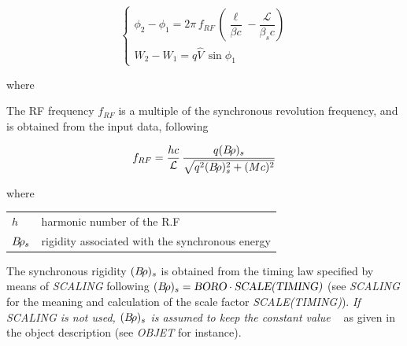 {$$ \left\{ 
\begin{array}{l}
	\phi_ 2-\phi_ 1= 2\pi \, f_{RF}\, 
	     \left(  \dfrac{\ell}{ \beta c} - \dfrac{\mathcal{L} }{ \beta_sc} \right) \\
	W_2-W_1 = q\hat  V\, \sin\phi_ 1  
\end{array}
\right. $$

\noindent  where
  
{\renewcommand{\arraystretch}{1}
 }
\bigskip

\noindent The RF frequency $ f_{RF} $ is a multiple of the synchronous 
revolution frequency, and is obtained from the input data, following 

$$ f_{RF} = \dfrac{hc }{\mathcal{L}}\, \dfrac{q(B\!\rho )_s }{ \sqrt{q^2(B\!\rho)^2_s+(Mc)^2}} $$

\noindent  where
   \begin{tabular}{l!{=}l}
   $h$ & harmonic  number  of  the  R.F\\
  $B\!\rho_s$ &  rigidity  associated with the synchronous energy \\
  \end{tabular}

\bigskip

\noindent The synchronous rigidity $ (B\!\rho)_s $  is obtained from the timing law specified by means of \textsl{SCALING} following 
$ (B\!\rho)_s= \textsl{BORO}\cdot \text{\textsl{SCALE(TIMING)}} $ 
(see  \textsl{SCALING}  for the meaning and calculation of the scale 
factor \textsl{SCALE(TIMING)}). \textsl{If \textsl{SCALING} is 
not used, $ (B\!\rho )_s $ is assumed to keep the constant value \BORO\
} as given in the object description (see \textsl{OBJET} for instance). \

}

